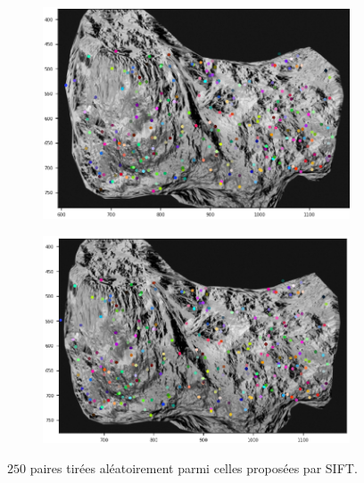 \documentclass[
	a4paper, %
	10pt, %
	unnumberedsections, %
	twoside, %
]{LTJournalArticle}
\begin{document}
\begin{figure}
	\centering
	\begin{subfigure}[H]{0.45\textwidth}
		\centering
		\includegraphics[width=\textwidth]{images/res1_sift_g.png}
	\end{subfigure}
	\hfill
	\begin{subfigure}[H]{0.45\textwidth}
		\centering
		\includegraphics[width=\textwidth]{images/res1_sift_d.png}
	\end{subfigure}
	\caption{$250$ paires tirées aléatoirement parmi celles proposées par SIFT.}
	\label{figure:fig_syn_sift}
\end{figure}
\end{document}
